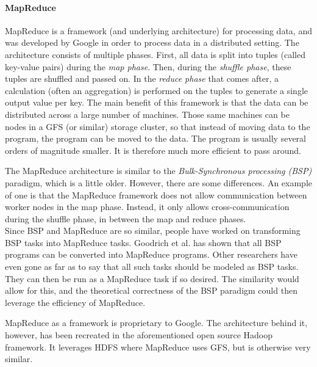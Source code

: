 \paragraph{MapReduce}
MapReduce is a framework (and underlying architecture) for processing data, and was developed by Google\cite{Dean04} in order to process data in a distributed setting. The architecture consists of multiple phases. First, all data is split into tuples (called key-value pairs) during the \textit{map phase}. Then, during the \textit{shuffle phase}, these tuples are shuffled and passed on. In the \textit{reduce phase} that comes after, a calculation (often an aggregation) is performed on the tuples to generate a single output value per key. The main benefit of this framework is that the data can be distributed across a large number of machines. Those same machines can be nodes in a GFS (or similar) storage cluster, so that instead of moving data to the program, the program can be moved to the data. The program is usually several orders of magnitude smaller. It is therefore much more efficient to pass around. %

The MapReduce architecture is similar to the \textit{Bulk-Synchronous processing (BSP)} paradigm, which is a little older. However, there are some differences. An example of one is that the MapReduce framework does not allow communication between worker nodes in the map phase. Instead, it only allows cross-communication during the shuffle phase, in between the map and reduce phases\cite{Pace12}.\\
Since BSP and MapReduce are so similar, people have worked on transforming BSP tasks into MapReduce tasks. Goodrich et al.\cite{Goo11} has shown that all BSP programs can be converted into MapReduce programs. Other researchers have even gone as far as to say that all such tasks should be modeled as BSP tasks. They can then be run as a MapReduce task if so desired. The similarity would allow for this, and the theoretical correctness of the BSP paradigm could then leverage the efficiency of MapReduce\cite{Pace12}.

MapReduce as a framework is proprietary to Google. The architecture behind it, however, has been recreated in the aforementioned open source Hadoop framework. It leverages HDFS where MapReduce uses GFS, but is otherwise very similar.

